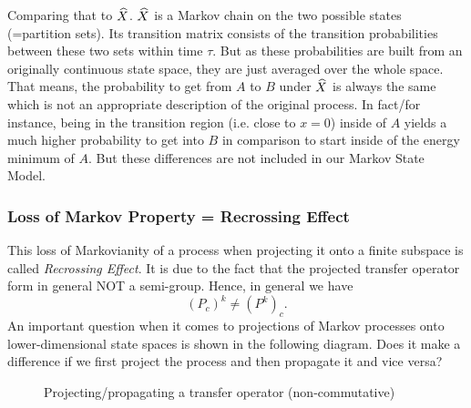 Comparing that to $\widehat{X}$. $\widehat{X}$ is a Markov chain on the two possible states (=partition sets). Its transition matrix consists of the transition probabilities between these two sets within time $\tau$.
But as these probabilities are built from an originally continuous state space, they are just averaged over the whole space. That means, the probability to get from $A$ to $B$ under $\widehat{X}$ is always the same which is not an appropriate description of the original process. In fact/for instance, being in the transition region (i.e. close to $x=0$) inside of $A$ yields a much higher probability to get into $B$ in comparison to start inside of the energy minimum of $A$. But these differences are not included in our Markov State Model.

\subsubsection*{Loss of Markov Property = Recrossing Effect} 

This loss of Markovianity of a process when projecting it onto a finite subspace is called \textit{Recrossing Effect}. 
It is due to the fact that the projected transfer operator form in general NOT a semi-group. 
Hence, in general we have
\begin{equation*}
(P_c)^k \neq (P^k)_c.
\end{equation*}
An important question when it comes to projections of Markov processes onto lower-dimensional state spaces is shown in the following diagram.
Does it make a difference if we first project the process and then propagate it and vice versa?

\begin{figure}[!ht]
	\centering
\caption{Projecting/propagating a transfer operator (non-commutative)}
\label{fig:diagram_transfer}
\end{figure}

